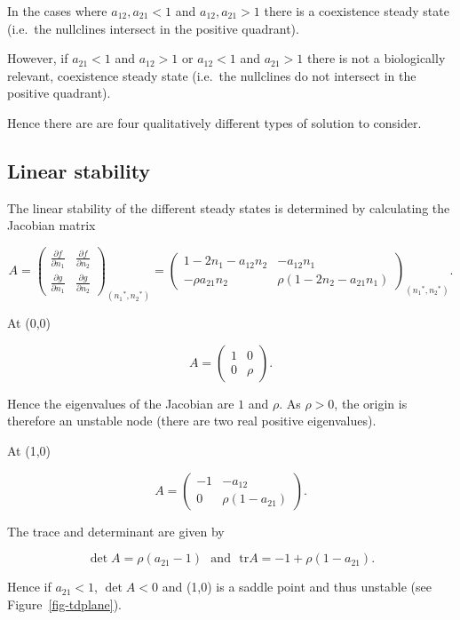 \documentclass[
  letterpaper,
  DIV=11,
  numbers=noendperiod]{scrreprt}
\begin{document}
In the cases where \(a_{12},a_{21}<1\) and \(a_{12},a_{21}>1\) there is
a coexistence steady state (i.e.~the nullclines intersect in the
positive quadrant).

However, if \(a_{21}<1\) and \(a_{12}>1\) or \(a_{12}<1\) and
\(a_{21}>1\) there is not a biologically relevant, coexistence steady
state (i.e.~the nullclines do not intersect in the positive quadrant).

Hence there are are four qualitatively different types of solution to
consider.

\subsection{Linear stability}\label{linear-stability-4}

The linear stability of the different steady states is determined by
calculating the Jacobian matrix

\[
A=\left(\begin{array}{rr}
\frac{\partial f}{\partial n_1}&\frac{\partial f}{\partial n_2} \\ \frac{\partial g}{\partial n_1 }&\frac{\partial g}{\partial n_2} \end{array}\right)_{({n_1}^*,{n_2}^*)} = \left(\begin{array}{rr}
1-2n_1 -a_{12}n_2&-a_{12}n_1 \\ -\rho a_{21}n_2 &\rho(1-2n_2-a_{21}n_1)\end{array}\right)_{({n_1}^*,{n_2}^*)}. 
\]

At (0,0)

\[
A=\left(\begin{array}{rr}
1& 0 \\ 0 & \rho\end{array}\right). 
\]

Hence the eigenvalues of the Jacobian are \(1\) and \(\rho\). As
\(\rho>0\), the origin is therefore an unstable node (there are two real
positive eigenvalues).

At (1,0)

\[
A=\left(\begin{array}{rr}
-1& -a_{12} \\ 0 & \rho(1-a_{21})\end{array}\right). 
\]

The trace and determinant are given by

\[
\det{A}=\rho  (a_{21}-1)\ \ \ \textrm{and} \ \ \ \mathrm{tr}{A}=-1+\rho(1-a_{21}).
\]

Hence if \(a_{21}<1\), \(\det{A}<0\) and (1,0) is a saddle point and
thus unstable (see Figure~\ref{fig-tdplane}).
\end{document}
